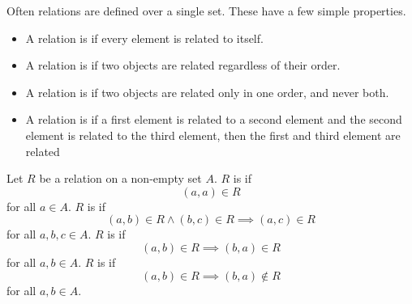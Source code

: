 \sbasic



\sstart



Often relations
are defined over a single
set.
These have a few simple
properties.


\begin{itemize}

\item
A relation is
if every element
is related to itself.

\item
A relation is
if two objects are related
regardless of their order.

\item
A relation is
if two objects are related only in
one order, and never both.

\item
A relation is
if a first element is
related to a second element
and the second element
is related to the third element,
then the first and third
element are related
\end{itemize}


Let $R$ be a relation on
a non-empty set $A$.
$R$ is  if
$$(a, a) \in R$$
for all $a \in A$.
$R$ is  if
$$(a, b) \in R \land (b, c) \in R \implies (a, c) \in R$$
for all $a, b, c \in A$.
$R$ is  if
$$(a, b) \in R \implies (b, a) \in R$$
for all $a, b \in A$.
$R$ is  if
$$(a, b) \in R \implies (b, a) \not\in R$$
for all $a, b \in A$.

\strats
